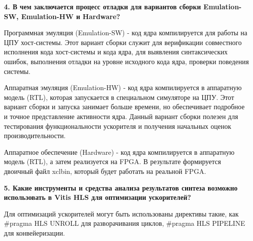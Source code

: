 \documentclass[12pt]{report}
\begin{document}
\textbf{4. В чем заключается процесс отладки для вариантов сборки Emulation-SW, Emulation-HW и Hardware?}

Программная эмуляция (Emulation-SW) - код ядра компилируется для работы на ЦПУ хост-системы. Этот вариант сборки служит для верификации совместного исполнения кода хост-системы и кода ядра, для выявления синтаксических ошибок, выполнения отладки на уровне исходного кода ядра, проверки поведения системы.

Аппаратная эмуляция (Emulation-HW) - код ядра компилируется в аппаратную модель (RTL), которая запускается в специальном симуляторе на ЦПУ. Этот вариант сборки и запуска занимает больше времени, но обеспечивает подробное и точное представление активности ядра. Данный вариант сборки полезен для тестирования функциональности ускорителя и получения начальных оценок производительности.

Аппаратное обеспечение (Hardware) - код ядра компилируется в аппаратную модель (RTL), а затем реализуется на FPGA. В результате формируется двоичный файл xclbin, который будет работать на реальной FPGA.

\textbf{5. Какие инструменты и средства анализа результатов синтеза возможно использовать в Vitis HLS для оптимизации ускорителей?}


Для оптимизаций ускорителей могут быть использованы директивы такие, как #pragma HLS UNROLL для разворачивания циклов, #pragma HLS PIPELINE для конвейеризации. 
\end{document}
